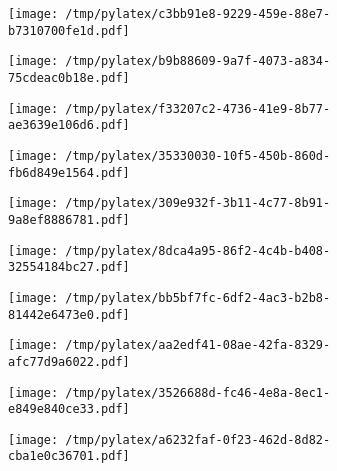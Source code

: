 \documentclass{article}
\begin{document}
\begin{figure}[htbp]
\begin{subfigure}[b]{.3\linewidth}
\texttt{[image: /tmp/pylatex/c3bb91e8-9229-459e-88e7-b7310700fe1d.pdf]}
\end{subfigure}
\begin{subfigure}[b]{.3\linewidth}
\texttt{[image: /tmp/pylatex/b9b88609-9a7f-4073-a834-75cdeac0b18e.pdf]}
\end{subfigure}
\begin{subfigure}[b]{.3\linewidth}
\texttt{[image: /tmp/pylatex/f33207c2-4736-41e9-8b77-ae3639e106d6.pdf]}
\end{subfigure}
\begin{subfigure}[b]{.3\linewidth}
\texttt{[image: /tmp/pylatex/35330030-10f5-450b-860d-fb6d849e1564.pdf]}
\end{subfigure}
\begin{subfigure}[b]{.3\linewidth}
\texttt{[image: /tmp/pylatex/309e932f-3b11-4c77-8b91-9a8ef8886781.pdf]}
\end{subfigure}
\begin{subfigure}[b]{.3\linewidth}
\texttt{[image: /tmp/pylatex/8dca4a95-86f2-4c4b-b408-32554184bc27.pdf]}
\end{subfigure}
\begin{subfigure}[b]{.3\linewidth}
\texttt{[image: /tmp/pylatex/bb5bf7fc-6df2-4ac3-b2b8-81442e6473e0.pdf]}
\end{subfigure}
\begin{subfigure}[b]{.3\linewidth}
\texttt{[image: /tmp/pylatex/aa2edf41-08ae-42fa-8329-afc77d9a6022.pdf]}
\end{subfigure}
\begin{subfigure}[b]{.3\linewidth}
\texttt{[image: /tmp/pylatex/3526688d-fc46-4e8a-8ec1-e849e840ce33.pdf]}
\end{subfigure}
\begin{subfigure}[b]{.3\linewidth}
\texttt{[image: /tmp/pylatex/a6232faf-0f23-462d-8d82-cba1e0c36701.pdf]}
\end{subfigure}
\end{figure}
\end{document}
